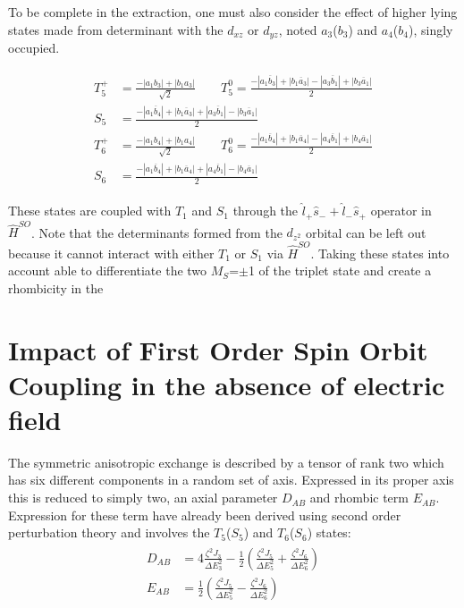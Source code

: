 \documentclass[10pt]{report}
\numberwithin{equation}{section}
\begin{document}
To be complete in the extraction, one must also consider the effect of higher lying states made from determinant with the $d_{xz}$ or $d_{yz}$, noted $a_3$($b_3$) and $a_4$($b_4$), singly occupied. 

\begin{align}\label{T5T6}
    \begin{split}
        T_5^+&=\frac{-|a_1b_3|+|b_1a_3|}{\sqrt{2}} \qquad T_5^0=\frac{-|a_1\overline{b}_3|+|b_1\overline{a}_3|-|a_3\overline{b}_1|+|b_3\overline{a}_1|}{2}\\
        S_5&=\frac{-|a_1\overline{b}_4|+|b_1\overline{a}_3|+|a_3\overline{b}_1|-|b_3\overline{a}_1|}{2}\\
        T_6^+&=\frac{-|a_1b_4|+|b_1a_4|}{\sqrt{2}} \qquad T_6^0=\frac{-|a_1\overline{b}_4|+|b_1\overline{a}_4|-|a_4\overline{b}_1|+|b_4\overline{a}_1|}{2}\\
        S_6&=\frac{-|a_1\overline{b}_4|+|b_1\overline{a}_4|+|a_4\overline{b}_1|-|b_4\overline{a}_1|}{2}
    \end{split}
\end{align}

These states are coupled with $T_1$ and $S_1$ through the $\hat{l}_+ \hat{s}_- + \hat{l}_-\hat{s}_+$ operator in $\hat{H}^{SO}$.
Note that the determinants formed from the $d_{z^2}$ orbital can be left out because it cannot interact with either $T_1$ or $S_1$ via $\hat{H}^{SO}$.
Taking these states into account able to differentiate the two $M_S$=$\pm$1 of the triplet state and create a rhombicity in the 

\section{Impact of First Order Spin Orbit Coupling in the absence of electric field}\label{sec:NoField}

The symmetric anisotropic exchange is described by a tensor of rank two which has six different components in a random set of axis.
Expressed in its proper axis this is reduced to simply two, an axial parameter $D_{AB}$ and rhombic term $E_{AB}$.
Expression for these term have already been derived using second order perturbation theory and involves the $T_5$($S_5$) and $T_6$($S_6$) states:
\begin{align}\label{eq:PertCu2Cl5}
    \begin{split}
        D_{AB}&=4\frac{\zeta^2 J_3}{\Delta E^2_3}-\frac{1}{2}(\frac{\zeta^2 J_5}{\Delta E^2_5}+\frac{\zeta^2 J_6}{\Delta E^2_6})\\
        E_{AB}&=\frac{1}{2}(\frac{\zeta^2 J_5}{\Delta E^2_5}-\frac{\zeta^2 J_6}{\Delta E^2_6})
    \end{split}
\end{align}
\end{document}
